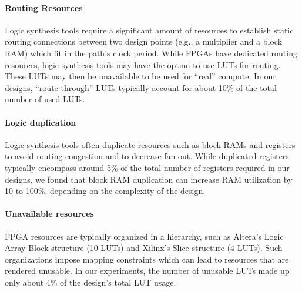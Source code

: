 \paragraph{Routing Resources} Logic synthesis tools require a significant amount of resources to establish static routing connections
between two design points (e.g., a multiplier and a block RAM) which fit in the path's clock period. While FPGAs have dedicated routing resources,
logic synthesis tools may have the option to use LUTs for routing. These LUTs may then be unavailable to be used for ``real'' compute.
In our designs, ``route-through'' LUTs typically account for about 10\% of the total number of used LUTs.


\paragraph{Logic duplication} Logic synthesis tools often duplicate resources such as block RAMs
and registers to avoid routing congestion and to decrease fan out. While duplicated registers typically
encompass around 5\% of the total number of registers required in our designs, we found that block RAM
duplication can increase RAM utilization by 10 to 100\%, depending on the complexity of the design.


\paragraph{Unavailable resources} FPGA resources are typically organized in a hierarchy, such as Altera's Logic Array Block structure (10 LUTs)
and Xilinx's Slice structure (4 LUTs). Such organizations impose mapping constraints which can lead to
resources that are rendered unusable. In our experiments, the number of unusable LUTs made up only about 4\% of the design's total LUT usage.

